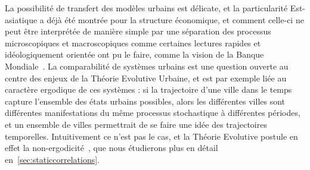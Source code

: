La possibilité de transfert des modèles urbains est délicate, et la particularité Est-asiatique a déjà été montrée pour la structure économique, et comment celle-ci ne peut être interprétée de manière simple par une séparation des processus microscopiques et macroscopiques comme certaines lectures rapides et idéologiquement orientée ont pu le faire, comme la vision de la Banque Mondiale~\cite{amsden1994isn}. La comparabilité de systèmes urbains est une question ouverte au centre des enjeux de la Théorie Evolutive Urbaine, et est par exemple liée au caractère ergodique de ces systèmes : si la trajectoire d'une ville dans le temps capture l'ensemble des états urbains possibles, alors les différentes villes sont différentes manifestations du même processus stochastique à différentes périodes, et un ensemble de villes permettrait de se faire une idée des trajectoires temporelles. Intuitivement ce n'est pas le cas, et la Théorie Evolutive postule en effet la non-ergodicité~\cite{pumain2012urban}, que nous étudierons plus en détail en~\ref{sec:staticcorrelations}.







\stars




